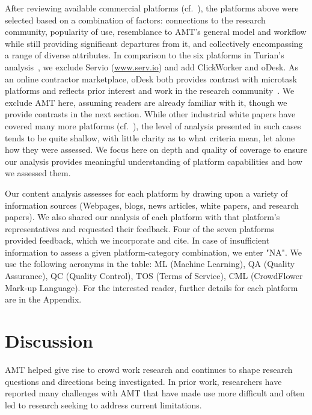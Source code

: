 \documentclass{sigchi}
\begin{document}
After reviewing available commercial platforms (cf.~\cite{ipeirotis-micro-services,ipeirotis-verticals}), the platforms above were selected based on a combination of factors: connections to the research community, popularity of use, resemblance to AMT's general model and workflow while still providing significant departures from it, and collectively encompassing a range of diverse attributes. In comparison to the six platforms in Turian's analysis~\cite{Turian12}, we exclude Servio (\url{www.serv.io}) and add ClickWorker and oDesk. As an online contractor marketplace, oDesk both provides contrast with microtask platforms and reflects prior interest and work in the research community~\cite{Ipeirotis-odesk}. We exclude AMT here, assuming readers are already familiar with it, though we provide contrasts in the next section. While other industrial white papers have covered many more platforms (cf.~\cite{frei2009paid}), the level of analysis presented in such cases tends to be quite shallow, with little clarity as to what criteria mean, let alone how they were assessed. We focus here on depth and quality of coverage to ensure our analysis provides meaningful understanding of platform capabilities and how we assessed them.

Our content analysis assesses for each platform by drawing upon a variety of information sources (Webpages, blogs, news articles, white papers, and research papers). We also shared our analysis of each platform with that platform's representatives and requested their feedback. Four of the seven platforms provided feedback, which we incorporate and cite. In case of insufficient information to assess a given platform-category combination, we enter "NA". We use the following acronyms in the table: ML (Machine Learning), QA (Quality Assurance), QC (Quality Control), TOS (Terms of Service), CML (CrowdFlower Mark-up Language). For the interested reader, further details for each platform are in the Appendix.  



\section{Discussion}

AMT helped give rise to crowd work research and continues to shape research questions and directions being investigated. In prior work, researchers have reported many challenges with AMT that have made use more difficult and often led to research seeking to address current limitations. 
\end{document}

